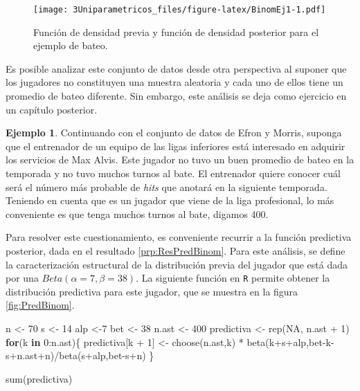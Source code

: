 \documentclass[
  10pt,
  spanish,
]{book}
\newenvironment{Shaded}{\begin{snugshade}}{\end{snugshade}}
\newcommand{\ConstantTok}[1]{\textcolor[rgb]{0.00,0.00,0.00}{#1}}
\newcommand{\ControlFlowTok}[1]{\textcolor[rgb]{0.13,0.29,0.53}{\textbf{#1}}}
\newcommand{\DecValTok}[1]{\textcolor[rgb]{0.00,0.00,0.81}{#1}}
\newcommand{\FunctionTok}[1]{\textcolor[rgb]{0.00,0.00,0.00}{#1}}
\newcommand{\NormalTok}[1]{#1}
\newcommand{\OtherTok}[1]{\textcolor[rgb]{0.56,0.35,0.01}{#1}}
\newcommand{\SpecialCharTok}[1]{\textcolor[rgb]{0.00,0.00,0.00}{#1}}
\theoremstyle{definition}
\theoremstyle{definition}
\newtheorem{example}{Ejemplo}[chapter]
\theoremstyle{definition}
\theoremstyle{definition}
\theoremstyle{remark}
\begin{document}
\begin{figure}
\centering
\texttt{[image: 3Uniparametricos\_files/figure-latex/BinomEj1-1.pdf]}
\caption{\label{fig:BinomEj1}Función de densidad previa y función de densidad posterior para el ejemplo de bateo.}
\end{figure}

Es posible analizar este conjunto de datos desde otra perspectiva al suponer que los jugadores no constituyen una muestra aleatoria y cada uno de ellos tiene un promedio de bateo diferente. Sin embargo, este análisis se deja como ejercicio en un capítulo posterior.

\begin{example}
\protect\hypertarget{exm:unnamed-chunk-29}{}{\label{exm:unnamed-chunk-29} }Continuando con el conjunto de datos de Efron y Morris, suponga que el entrenador de un equipo de las ligas inferiores está interesado en adquirir los servicios de Max Alvis. Este jugador no tuvo un buen promedio de bateo en la temporada y no tuvo muchos turnos al bate. El entrenador quiere conocer cuál será el número más probable de \emph{hits} que anotará en la siguiente temporada. Teniendo en cuenta que es un jugador que viene de la liga profesional, lo más conveniente es que tenga muchos turnos al bate, digamos 400.

Para resolver este cuestionamiento, es conveniente recurrir a la función predictiva posterior, dada en el resultado \ref{prp:ResPredBinom}. Para este análisis, se define la caracterización estructural de la distribución previa del jugador que está dada por una \(Beta(\alpha=7, \beta=38)\). La siguiente función en \texttt{R} permite obtener la distribución predictiva para este jugador, que se muestra en la figura \ref{fig:PredBinom}.
\end{example}

\begin{Shaded}
\begin{Highlighting}[]
\NormalTok{n }\OtherTok{\textless{}{-}} \DecValTok{70}
\NormalTok{s }\OtherTok{\textless{}{-}} \DecValTok{14}
\NormalTok{alp }\OtherTok{\textless{}{-}}\DecValTok{7}
\NormalTok{bet }\OtherTok{\textless{}{-}} \DecValTok{38}
\NormalTok{n.ast }\OtherTok{\textless{}{-}} \DecValTok{400}
\NormalTok{predictiva }\OtherTok{\textless{}{-}} \FunctionTok{rep}\NormalTok{(}\ConstantTok{NA}\NormalTok{, n.ast }\SpecialCharTok{+} \DecValTok{1}\NormalTok{)}
\ControlFlowTok{for}\NormalTok{(k }\ControlFlowTok{in} \DecValTok{0}\SpecialCharTok{:}\NormalTok{n.ast)\{}
\NormalTok{  predictiva[k }\SpecialCharTok{+} \DecValTok{1}\NormalTok{] }\OtherTok{\textless{}{-}}
  \FunctionTok{choose}\NormalTok{(n.ast,k) }\SpecialCharTok{*}
    \FunctionTok{beta}\NormalTok{(k}\SpecialCharTok{+}\NormalTok{s}\SpecialCharTok{+}\NormalTok{alp,bet}\SpecialCharTok{{-}}\NormalTok{k}\SpecialCharTok{{-}}\NormalTok{s}\SpecialCharTok{+}\NormalTok{n.ast}\SpecialCharTok{+}\NormalTok{n)}\SpecialCharTok{/}\FunctionTok{beta}\NormalTok{(s}\SpecialCharTok{+}\NormalTok{alp,bet}\SpecialCharTok{{-}}\NormalTok{s}\SpecialCharTok{+}\NormalTok{n)}
\NormalTok{\}}

\FunctionTok{sum}\NormalTok{(predictiva)}
\end{Highlighting}
\end{Shaded}
\end{document}
